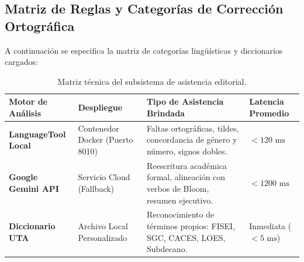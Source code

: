 \documentclass[12pt,a4paper]{article}
\begin{document}
\subsection{Matriz de Reglas y Categorías de Corrección Ortográfica}
A continuación se especifica la matriz de categorías lingüísticas y diccionarios cargados:
\begin{table}[H]
\centering
\small
\renewcommand{\arraystretch}{1.2}
\begin{tabularx}{\textwidth}{|>{\hsize=0.9\hsize\raggedright\arraybackslash\bfseries\footnotesize}X|>{\hsize=0.8\hsize\raggedright\arraybackslash\footnotesize}X|>{\hsize=1.8\hsize\raggedright\arraybackslash\footnotesize}X|>{\hsize=0.5\hsize\centering\arraybackslash\footnotesize}X|}
\hline
\rowcolor{tableheader}
\textbf{Motor de Análisis} & \textbf{Despliegue} & \textbf{Tipo de Asistencia Brindada} & \textbf{Latencia Promedio} \\
\hline
LanguageTool Local & Contenedor Docker (Puerto 8010) & Faltas ortográficas, tildes, concordancia de género y número, signos dobles. & $<120\text{ ms}$ \\
\hline
Google Gemini API & Servicio Cloud (Fallback) & Reescritura académica formal, alineación con verbos de Bloom, resumen ejecutivo. & $<1200\text{ ms}$ \\
\hline
Diccionario UTA & Archivo Local Personalizado & Reconocimiento de términos propios: FISEI, SGC, CACES, LOES, Subdecano. & Inmediata ($<5\text{ ms}$) \\
\hline
\end{tabularx}
\caption{Matriz técnica del subsistema de asistencia editorial.}
\label{tab:grammar_matrix}
\end{table}
\end{document}
